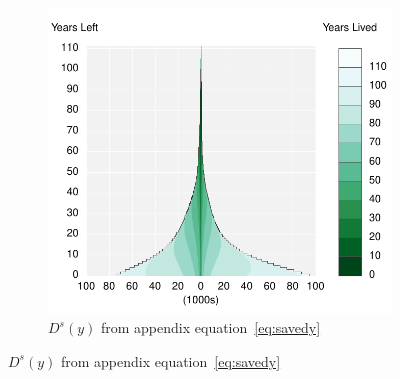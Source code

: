 \documentclass{article}
\begin{document}
\begin{figure}
\begin{subfigure}[b]{.48\linewidth}
    \includegraphics[scale=.55]{Figures/Deathsyx10.pdf}
    \caption*{$D^s(y)$ from appendix equation~\eqref{eq:savedy}}
\end{subfigure}
\end{figure}
\end{document}
